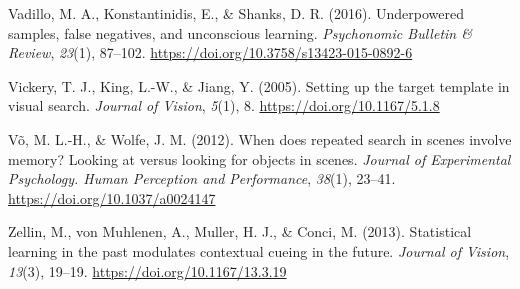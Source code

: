 \documentclass[
  man,floatsintext]{apa7}
\newlength{\cslhangindent}
\newlength{\cslentryspacingunit} %
\newenvironment{CSLReferences}[2] %
 {%
  \setlength{\parindent}{0pt}
  \ifodd #1
  \let\oldpar\par
  \def\par{\hangindent=\cslhangindent\oldpar}
  \fi
  \setlength{\parskip}{#2\cslentryspacingunit}
 }%
 {}
\begin{document}
\begin{CSLReferences}{1}{0}
\leavevmode{}%
Vadillo, M. A., Konstantinidis, E., \& Shanks, D. R. (2016). Underpowered samples, false negatives, and unconscious learning. \emph{Psychonomic Bulletin \& Review}, \emph{23}(1), 87--102. \url{https://doi.org/10.3758/s13423-015-0892-6}

\leavevmode{}%
Vickery, T. J., King, L.-W., \& Jiang, Y. (2005). Setting up the target template in visual search. \emph{Journal of Vision}, \emph{5}(1), 8. \url{https://doi.org/10.1167/5.1.8}

\leavevmode{}%
Võ, M. L.-H., \& Wolfe, J. M. (2012). When does repeated search in scenes involve memory? {Looking} at versus looking for objects in scenes. \emph{Journal of Experimental Psychology. Human Perception and Performance}, \emph{38}(1), 23--41. \url{https://doi.org/10.1037/a0024147}

\leavevmode{}%
Zellin, M., von Muhlenen, A., Muller, H. J., \& Conci, M. (2013). Statistical learning in the past modulates contextual cueing in the future. \emph{Journal of Vision}, \emph{13}(3), 19--19. \url{https://doi.org/10.1167/13.3.19}

\end{CSLReferences}
\end{document}
